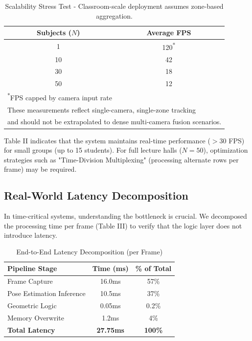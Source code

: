 \documentclass[conference]{IEEEtran}
\begin{document}
\begin{table}[htbp]
\caption{Scalability Stress Test - Classroom-scale deployment assumes zone-based aggregation.}
\begin{center}
\begin{tabular}{cc}
\toprule
\textbf{Subjects ($N$)} & \textbf{Average FPS} \\
\midrule
1 & 120\textsuperscript{*} \\
10 & 42 \\
30 & 18 \\
50 & 12 \\
\bottomrule
\multicolumn{2}{l}{\textsuperscript{*}\footnotesize{FPS capped by camera input rate}} \\
\multicolumn{2}{l}{\footnotesize{These measurements reflect single-camera, single-zone tracking}} \\
\multicolumn{2}{l}{\footnotesize{and should not be extrapolated to dense multi-camera fusion scenarios.}}
\end{tabular}
\end{center}
\end{table}

Table II indicates that the system maintains real-time performance ($>30$ FPS) for small groups (up to 15 students). For full lecture halls ($N=50$), optimization strategies such as "Time-Division Multiplexing" (processing alternate rows per frame) may be required.

\subsection{Real-World Latency Decomposition}
In time-critical systems, understanding the bottleneck is crucial. We decomposed the processing time per frame (Table III) to verify that the logic layer does not introduce latency.

\begin{table}[htbp]
\caption{End-to-End Latency Decomposition (per Frame)}
\begin{center}
\begin{tabular}{lcc}
\toprule
\textbf{Pipeline Stage} & \textbf{Time (ms)} & \textbf{\% of Total} \\
\midrule
Frame Capture & 16.0ms & 57\% \\
Pose Estimation Inference & 10.5ms & 37\% \\
Geometric Logic & 0.05ms & 0.2\% \\
Memory Overwrite & 1.2ms & 4\% \\
\textbf{Total Latency} & \textbf{27.75ms} & \textbf{100\%} \\
\bottomrule
\end{tabular}
\end{center}
\end{table}
\end{document}
